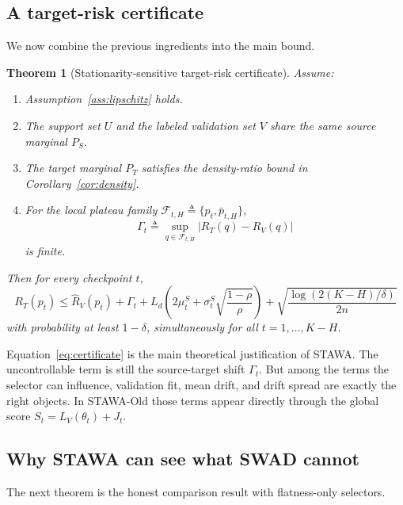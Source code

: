 \documentclass{article}
\newtheorem{theorem}{Theorem}
\newcommand{\stawa}{\textup{\textsc{STAWA}}}
\newcommand{\swad}{\textup{\textsc{SWAD}}}
\begin{document}
\subsection{A target-risk certificate}

We now combine the previous ingredients into the main bound.

\begin{theorem}[Stationarity-sensitive target-risk certificate]
\label{thm:certificate}
Assume:
\begin{enumerate}[label=(\roman*), leftmargin=1.5em]
    \item Assumption~\ref{ass:lipschitz} holds.
    \item The support set $U$ and the labeled validation set $V$ share the same source marginal $P_S$.
    \item The target marginal $P_T$ satisfies the density-ratio bound in Corollary~\ref{cor:density}.
    \item For the local plateau family $\mathcal{F}_{t,H} \triangleq \{p_t,\bar p_{t,H}\}$,
    \begin{equation}
        \Gamma_t
        \triangleq
        \sup_{q\in \mathcal{F}_{t,H}}
        |R_T(q)-R_V(q)|
    \end{equation}
    is finite.
\end{enumerate}
Then for every checkpoint $t$,
\begin{equation}
    R_T(p_t)
    \le
    \hat R_V(p_t)
    +
    \Gamma_t
    +
    L_d \left(
        2\mu_t^S + \sigma_t^S \sqrt{\frac{1-\rho}{\rho}}
    \right)
    +
    \sqrt{\frac{\log(2(K-H)/\delta)}{2n}}
    \label{eq:certificate}
\end{equation}
with probability at least $1-\delta$, simultaneously for all $t=1,\dots,K-H$.
\end{theorem}

Equation~\eqref{eq:certificate} is the main theoretical justification of \stawa{}. The uncontrollable term is still the source-target shift $\Gamma_t$. But among the terms the selector can influence, validation fit, mean drift, and drift spread are exactly the right objects. In STAWA-Old those terms appear directly through the global score $S_t = L_V(\theta_t) + J_t$.

\subsection{Why \stawa{} can see what \swad{} cannot}

The next theorem is the honest comparison result with flatness-only selectors.
\end{document}
